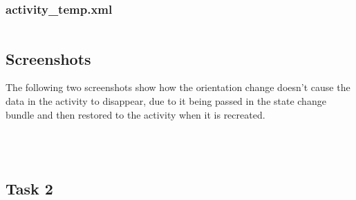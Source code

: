 \documentclass[11pt,english,numbers=endperiod,parskip=half]{scrartcl}
\begin{document}
\subsubsection{activity\_temp.xml}
\inputminted{xml}{../../Apps/Converters/app/src/main/res/layout/activity_temp.xml}



\subsection{Screenshots}
The following two screenshots show how the orientation change doesn't cause the data in the activity to disappear, due to it being passed in the state change bundle and then restored to the activity when it is recreated.

\setlength\fboxsep{0pt}
\setlength\fboxrule{0.5pt}
\\

\\

\subsection{Task 2}
\end{document}

